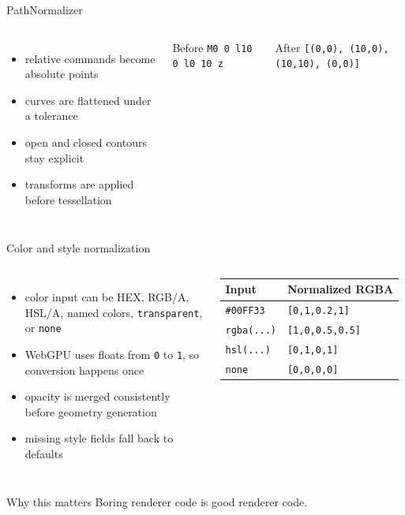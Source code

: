 \documentclass[aspectratio=43]{beamer}
\begin{document}
\begin{frame}{PathNormalizer}
\small
\begin{columns}[T,onlytextwidth]
	\begin{itemize}
		\item relative commands become absolute points
		\item curves are flattened under a tolerance
		\item open and closed contours stay explicit
		\item transforms are applied before tessellation
	\end{itemize}

	\begin{block}{Before}
	\centering
	\texttt{M0 0 l10 0 l0 10 z}
	\end{block}

	\begin{block}{After}
	\centering
	\texttt{[(0,0), (10,0), (10,10), (0,0)]}
	\end{block}
\end{columns}
\end{frame}

\begin{frame}{Color and style normalization}
\small
\begin{columns}[T,onlytextwidth]
	\begin{itemize}
		\item color input can be HEX, RGB/A, HSL/A, named colors, \texttt{transparent}, or \texttt{none}
		\item WebGPU uses floats from \texttt{0} to \texttt{1}, so conversion happens once
		\item opacity is merged consistently before geometry generation
		\item missing style fields fall back to defaults
	\end{itemize}

	\centering
	{\scriptsize
	\begin{tabular}{|l|l|}
	\hline
	\textbf{Input} & \textbf{Normalized RGBA} \\
	\hline
	\texttt{\#00FF33} & \texttt{[0,1,0.2,1]} \\
	\hline
	\texttt{rgba(...)} & \texttt{[1,0,0.5,0.5]} \\
	\hline
	\texttt{hsl(...)} & \texttt{[0,1,0,1]} \\
	\hline
	\texttt{none} & \texttt{[0,0,0,0]} \\
	\hline
	\end{tabular}
	}
\end{columns}
\vspace{0.3em}
\begin{block}{Why this matters}
Boring renderer code is good renderer code.
\end{block}
\end{frame}
\end{document}
